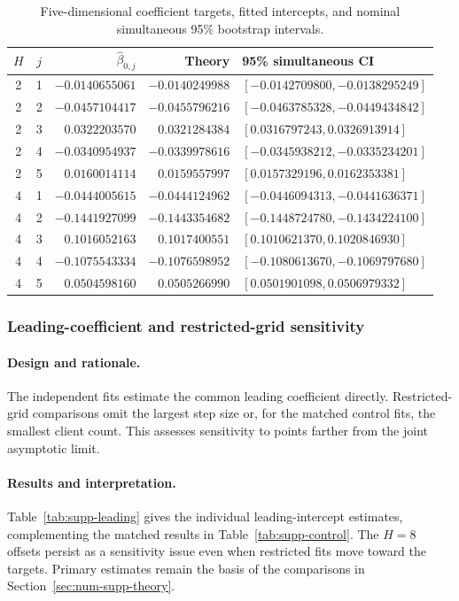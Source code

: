 \begin{table}[tbp]
\centering\small
\setlength{\tabcolsep}{4pt}
\caption{Five-dimensional \Scaf{} coefficient targets, fitted
intercepts, and nominal simultaneous 95\% bootstrap intervals.}
\label{tab:E-d5}
\begin{tabular}{@{}ccrrl@{}}
\toprule
$H$ & $j$ & $\widehat\beta_{0,j}$ & Theory & 95\% simultaneous CI \\
\midrule
2 & 1 & $-0.0140655061$ & $-0.0140249988$ & $[-0.0142709800,-0.0138295249]$ \\
2 & 2 & $-0.0457104417$ & $-0.0455796216$ & $[-0.0463785328,-0.0449434842]$ \\
2 & 3 & $ 0.0322203570$ & $ 0.0321284384$ & $[ 0.0316797243, 0.0326913914]$ \\
2 & 4 & $-0.0340954937$ & $-0.0339978616$ & $[-0.0345938212,-0.0335234201]$ \\
2 & 5 & $ 0.0160014114$ & $ 0.0159557997$ & $[ 0.0157329196, 0.0162353381]$ \\
\midrule
4 & 1 & $-0.0444005615$ & $-0.0444124962$ & $[-0.0446094313,-0.0441636371]$ \\
4 & 2 & $-0.1441927099$ & $-0.1443354682$ & $[-0.1448724780,-0.1434224100]$ \\
4 & 3 & $ 0.1016052163$ & $ 0.1017400551$ & $[ 0.1010621370, 0.1020846930]$ \\
4 & 4 & $-0.1075543334$ & $-0.1076598952$ & $[-0.1080613670,-0.1069797680]$ \\
4 & 5 & $ 0.0504598160$ & $ 0.0505266990$ & $[ 0.0501901098, 0.0506979332]$ \\
\bottomrule
\end{tabular}
\end{table}

\subsubsection{Leading-coefficient and restricted-grid sensitivity}
\label{app:supp-controlled}

\paragraph{Design and rationale.}
The independent fits estimate the common leading coefficient directly.
Restricted-grid comparisons omit the largest step size or, for the
matched control fits, the smallest client count. This assesses sensitivity
to points farther from the joint asymptotic limit.

\paragraph{Results and interpretation.}
Table~\ref{tab:supp-leading} gives the individual leading-intercept
estimates, complementing the matched results in
Table~\ref{tab:supp-control}. The $H=8$ offsets persist as a sensitivity
issue even when restricted fits move toward the targets. Primary estimates
remain the basis of the comparisons in Section~\ref{sec:num-supp-theory}.

